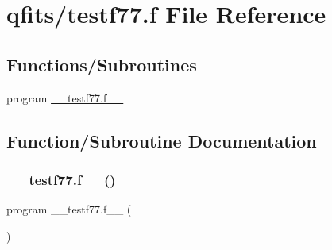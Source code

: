 \hypertarget{testf77_8f}{}\section{qfits/testf77.f File Reference}
\label{testf77_8f}
\subsection*{Functions/\+Subroutines}
\begin{DoxyCompactItemize}
\item 
program \hyperlink{testf77_8f_acf2bc7e7c8c3b7d51b9aa94e4c3cf159}{\+\_\+\+\_\+testf77.\+f\+\_\+\+\_\+}
\end{DoxyCompactItemize}


\subsection{Function/\+Subroutine Documentation}
\mbox{\label{testf77_8f_acf2bc7e7c8c3b7d51b9aa94e4c3cf159}} 
\subsubsection{\texorpdfstring{\+\_\+\+\_\+testf77.\+f\+\_\+\+\_\+()}{\_\_testf77.f\_\_()}}
{\footnotesize\ttfamily program \+\_\+\+\_\+testf77.\+f\+\_\+\+\_\+ (\begin{DoxyParamCaption}{ }\end{DoxyParamCaption})}

